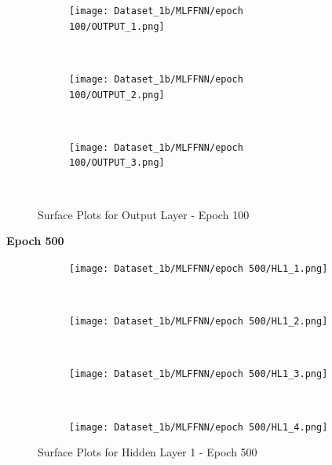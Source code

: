\begin{figure}[!ht]
    \centering
    \begin{subfigure}[h]{0.5\textwidth}
        \centering
        \texttt{[image: Dataset\_1b/MLFFNN/epoch 100/OUTPUT\_1.png]}
    \end{subfigure}%
    ~ 
    \begin{subfigure}[h]{0.5\textwidth}
        \centering
        \texttt{[image: Dataset\_1b/MLFFNN/epoch 100/OUTPUT\_2.png]}
    \end{subfigure}%
    ~
    
    \begin{subfigure}[h]{0.4\textwidth}
        \centering
        \texttt{[image: Dataset\_1b/MLFFNN/epoch 100/OUTPUT\_3.png]}
    \end{subfigure}
    ~
    \caption{Surface Plots for Output Layer - Epoch 100}
    \label{fig:13}
\end{figure}

\textbf{Epoch 500}

\begin{figure}[!ht]
    \centering
    \begin{subfigure}[h]{0.5\textwidth}
        \centering
        \texttt{[image: Dataset\_1b/MLFFNN/epoch 500/HL1\_1.png]}
    \end{subfigure}%
    ~ 
    \begin{subfigure}[h]{0.5\textwidth}
        \centering
        \texttt{[image: Dataset\_1b/MLFFNN/epoch 500/HL1\_2.png]}
    \end{subfigure}%
    ~
    
    \begin{subfigure}[h]{0.4\textwidth}
        \centering
        \texttt{[image: Dataset\_1b/MLFFNN/epoch 500/HL1\_3.png]}
    \end{subfigure}
    ~
    \begin{subfigure}[h]{0.4\textwidth}
        \centering
        \texttt{[image: Dataset\_1b/MLFFNN/epoch 500/HL1\_4.png]}
    \end{subfigure}
    \caption{Surface Plots for Hidden Layer 1 - Epoch 500}
    \label{fig:13}
\end{figure}


